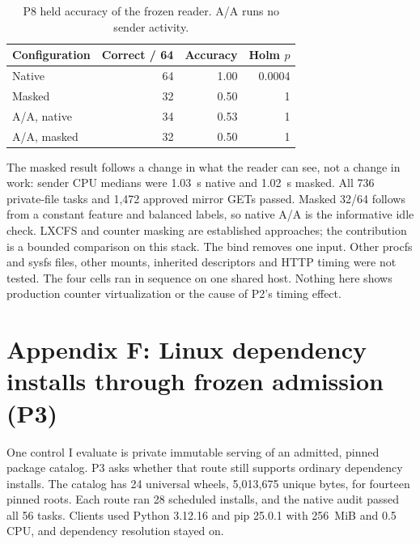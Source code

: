 {\begin{table}[!ht]\centering\small
\begin{tabular}{lrrr}\toprule
Configuration & Correct / 64 & Accuracy & Holm $p$ \\\midrule
Native & 64 & 1.00 & 0.0004 \\
Masked & 32 & 0.50 & 1 \\
A/A, native & 34 & 0.53 & 1 \\
A/A, masked & 32 & 0.50 & 1 \\\bottomrule
\end{tabular}
\caption{P8 held accuracy of the frozen reader. A/A runs no sender activity.}
\end{table}

The masked result follows a change in what the reader can see, not a change in work: sender CPU medians were 1.03~s native and 1.02~s masked.
All 736 private-file tasks and 1,472 approved mirror GETs passed.
Masked 32/64 follows from a constant feature and balanced labels, so native A/A is the informative idle check.
LXCFS and counter masking are established approaches; the contribution is a bounded comparison on this stack.
The bind removes one input. Other procfs and sysfs files, other mounts, inherited descriptors and HTTP timing were not tested.
The four cells ran in sequence on one shared host. Nothing here shows production counter virtualization or the cause of P2's timing effect.

\section*{Appendix F: Linux dependency installs through frozen admission (P3)}

One control I evaluate is private immutable serving of an admitted, pinned package catalog.
P3 asks whether that route still supports ordinary dependency installs.
The catalog has 24 universal wheels, 5,013,675 unique bytes, for fourteen pinned roots.
Each route ran 28 scheduled installs, and the native audit passed all 56 tasks.
Clients used Python 3.12.16 and pip 25.0.1 with 256~MiB and 0.5 CPU, and dependency resolution stayed on.

}
